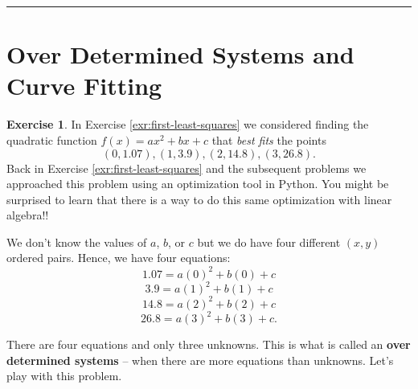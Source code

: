 \documentclass[
]{book}
\theoremstyle{definition}
\theoremstyle{definition}
\theoremstyle{definition}
\newtheorem{exercise}{Exercise}[chapter]
\theoremstyle{remark}
\begin{document}
\begin{center}\rule{0.5\linewidth}{0.5pt}\end{center}

\hypertarget{over-determined-systems-and-curve-fitting}{%
\section{Over Determined Systems and Curve Fitting}\label{over-determined-systems-and-curve-fitting}}

\begin{exercise}
\protect\hypertarget{exr:unnamed-chunk-355}{}{\label{exr:unnamed-chunk-355} }In Exercise \ref{exr:first-least-squares} we considered finding the quadratic function \(f(x) = ax^2 + bx + c\) that \emph{best fits} the points
\[ (0, 1.07), (1, 3.9), (2, 14.8), (3, 26.8). \]
Back in Exercise \ref{exr:first-least-squares} and the subsequent problems we approached this problem using an optimization tool in Python. You might be surprised to learn that there is a way to do this same optimization with linear algebra!!

We don't know the values of \(a\), \(b\), or \(c\) but we do have four different \((x,y)\) ordered pairs. Hence, we have four equations:
\[ 1.07 = a(0)^2 + b(0) + c \]
\[ 3.9 = a(1)^2 + b(1) + c  \]
\[ 14.8 = a(2)^2 + b(2) + c \]
\[ 26.8 = a(3)^2 + b(3) + c. \]

There are four equations and only three unknowns. This is what is called an \textbf{over determined systems} -- when there are more equations than unknowns. Let's play with this problem.


\end{exercise}
\end{document}
